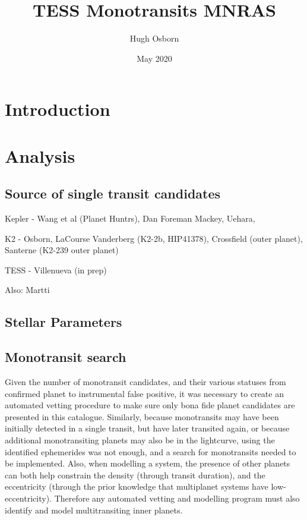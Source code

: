 \documentclass{article}
\title{TESS Monotransits MNRAS}
\author{Hugh Osborn}
\date{May 2020}
\begin{document}
\maketitle

\section{Introduction}


\section{Analysis}

\subsection{Source of single transit candidates}
Kepler - Wang et al (Planet Huntrs), Dan Foreman Mackey, Uehara,

K2 - Osborn, LaCourse
Vanderberg (K2-2b, HIP41378), Crossfield (outer planet), Santerne (K2-239 outer planet)

TESS - Villenueva (in prep)

Also: Martti

\subsection{Stellar Parameters}\label{stellarparams}

\subsection{Monotransit search}

Given the number of monotransit candidates, and their various statuses from confirmed planet to instrumental false positive, it was necessary to create an automated vetting procedure to make sure only bona fide planet candidates are presented in this catalogue.
Similarly, because monotransits may have been initially detected in a single transit, but have later transited again, or because additional monotransiting planets may also be in the lightcurve, using the identified ephemerides was not enough, and a search for monotransits needed to be implemented.
Also, when modelling a system, the presence of other planets can both help constrain the density (through transit duration), and the eccentricity (through the prior knowledge that multiplanet systems have low-eccentricity).
Therefore any automated vetting and modelling program must also identify and model multitransiting inner planets.
\end{document}
